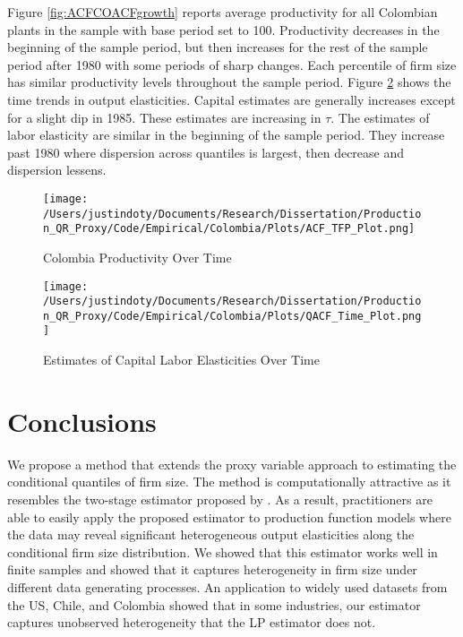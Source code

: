 \documentclass[11pt]{article}
\begin{document}
Figure \ref{fig:ACFCOACFgrowth} reports average productivity for all Colombian plants in the sample with base period set to 100. Productivity decreases in the beginning of the sample period, but then increases for the rest of the sample period after 1980 with some periods of sharp changes. Each percentile of firm size has similar productivity levels throughout the sample period. Figure \ref{fig:ACFCOLtimecoef} shows the time trends in output elasticities. Capital estimates are generally increases except for a slight dip in 1985. These estimates are increasing in $\tau$. The estimates of labor elasticity are similar in the beginning of the sample period. They increase past 1980 where dispersion across quantiles is largest, then decrease and dispersion lessens.

\begin{figure}[H]
\centering
\caption{Colombia Productivity Over Time}
\texttt{[image: /Users/justindoty/Documents/Research/Dissertation/Production\_QR\_Proxy/Code/Empirical/Colombia/Plots/ACF\_TFP\_Plot.png]}
\label{fig:ACFCOLpgrowth}
\end{figure}

\begin{figure}[H]
\centering
\caption{Estimates of Capital Labor Elasticities Over Time}
\texttt{[image: /Users/justindoty/Documents/Research/Dissertation/Production\_QR\_Proxy/Code/Empirical/Colombia/Plots/QACF\_Time\_Plot.png]}
\label{fig:ACFCOLtimecoef}
\end{figure}

\section{Conclusions} \label{conclusion}

We propose a method that extends the proxy variable approach to estimating the conditional quantiles of firm size. The method is computationally attractive as it resembles the two-stage estimator proposed by \cite{Canay2011}. As a result, practitioners are able to easily apply the proposed estimator to production function models where the data may reveal significant heterogeneous output elasticities along the conditional firm size distribution. We showed that this estimator works well in finite samples and showed that it captures heterogeneity in firm size under different data generating processes. An application to widely used datasets from the US, Chile, and Colombia showed that in some industries, our estimator captures unobserved heterogeneity that the LP estimator does not.
\end{document}
